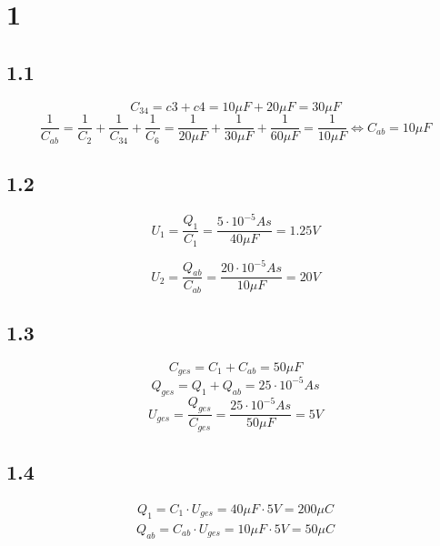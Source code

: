 \documentclass{article}
\begin{document}
\section*{1}
\subsection*{1.1}
\begin{equation}
    C_{34} = c3+c4 = 10\mu F + 20 \mu F = 30 \mu F
\end{equation}
\begin{equation}
    \frac{1}{C_{ab}} = 
    \frac{1}{C_2} +
    \frac{1}{C_{34}} +
    \frac{1}{C_6} =
    \frac{1}{20\mu F} +
    \frac{1}{30\mu F} +
    \frac{1}{60\mu F}
    = \frac{1}{10\mu F}
    \Leftrightarrow C_{ab} = 10\mu F
\end{equation}
\subsection*{1.2}
\begin{equation}
    U_1 = \frac{Q_1}{C_1} = \frac{5 \cdot 10^{-5}As}{40\mu F}
    = 1.25V
\end{equation}

\begin{equation}
    U_2 = \frac{Q_{ab}}{C_{ab}} = \frac{20 \cdot 10^{-5}As}{10\mu F}
    = 20V
\end{equation}
\subsection*{1.3}
\begin{equation}
    C_{ges} = C_1 + C_{ab} = 50 \mu F
\end{equation}
\begin{equation}
    Q_{ges} = Q_1 + Q_{ab} = 25 \cdot 10^{-5} As
\end{equation}
\begin{equation}
    U_{ges} = \frac{Q_{ges}}{C_{ges}} = \frac{25\cdot 10^{-5}As}{50\mu F}=5V
\end{equation}
\subsection*{1.4}
\begin{align}
    Q_1 = C_1 \cdot U_{ges} = 40\mu F \cdot 5V = 200 \mu C
\end{align}
\begin{align}
    Q_{ab} = C_{ab} \cdot U_{ges} = 10\mu F \cdot 5V = 50 \mu C
\end{align}
\newpage
\end{document}

